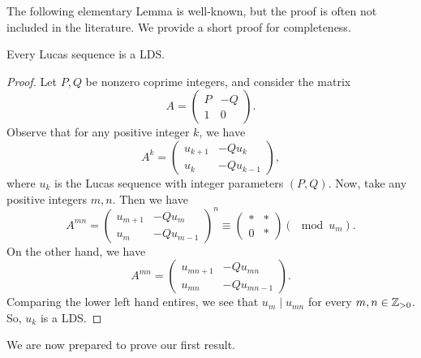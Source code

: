 \documentclass[11pt]{amsart}
\begin{document}
The following elementary Lemma is well-known, but the proof is often not included in the literature. We provide a short proof for completeness. 
\begin{lem}\label{LucasDivisibility} Every Lucas sequence is a LDS. 
\begin{proof}
Let $P, Q$ be nonzero coprime integers, and consider the matrix
\[A=\begin{pmatrix} P & -Q \\ 1 & 0 \end{pmatrix}.\]
Observe that for any positive integer $k$, we have
\[A^k=\begin{pmatrix} u_{k+1} & -Q u_k \\ u_k & -Q u_{k-1} \end{pmatrix},\]
where $u_k$ is the Lucas sequence with integer parameters $(P, Q)$. Now, take any positive integers $m, n$. Then we have
\[A^{mn}=\begin{pmatrix} u_{m+1} & -Q u_m \\ u_m & -Qu_{m-1} \end{pmatrix}^n \equiv \begin{pmatrix} * & * \\ 0 & * \end{pmatrix} (\mod u_m).\]
On the other hand, we have
\[A^{mn}=\begin{pmatrix} u_{mn+1}  & -Q u_{mn} \\ u_{mn} & -Q u_{mn-1} \end{pmatrix}.\]
Comparing the lower left hand entires, we see that $u_m \mid u_{mn}$
for every $m, n \in \mathbb{Z}_{>0}$. So, $u_k$ is a LDS. 
\end{proof}
\end{lem}

We are now prepared to prove our first result.
\end{document}
